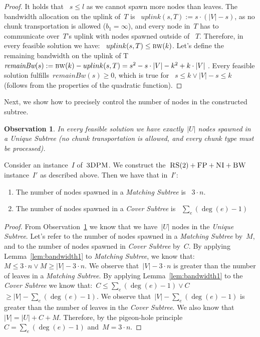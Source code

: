 \documentclass[preprint,12pt]{elsarticle}
\newcommand{\CC}{\textsc{NI}}
\newcommand{\FP}{\textsc{FP}}
\newcommand{\RS}{\textsc{RS}}
\newcommand{\BW}{\textsc{BW}}
\newcommand{\TDPM}{\textsc{3DPM}}
\newcommand{\numNodes}{\ensuremath{|V|}}
\newcommand{\UnqSubtree}{{{\emph{Unique Subtree}}}}
\newcommand{\MatchSubtree}{{\emph{Matching Subtree}}}
\newcommand{\CoverSubtree}{{\emph{Cover Subtree}}}
\newcommand{\remainBw}{\textit{remainBw}}
\newcommand{\Band}{\textsc{bw}}
\newtheorem{obs}{Observation}
\newcommand{\CostTrans}{\ensuremath{b_1}}
\begin{document}
\begin{proof}
It holds that ~$s\leq l$ as we cannot spawn more nodes than leaves.
  The bandwidth allocation on the uplink of~$T$ is
 ~$uplink(s,T) := s\cdot (\numNodes - s)$, as no chunk transportation
  is allowed ($\CostTrans = \infty$), and every node in~$T$ has to
  communicate over~$T$'s uplink with nodes spawned outside of
 ~$T$. Therefore, in every feasible solution we have:
 ~$uplink(s, T) \leq \Band(k)$.  Let's define the remaining bandwidth
  on the uplink of T~$\remainBw(s) := \Band(k)-uplink(s, T) = s^2 - s\cdot \numNodes -
  k^2+k\cdot \numNodes~$.
  Every feasible solution fulfills~$\remainBw(s) \geq 0$, which is true for
 ~$s \leq k \vee \numNodes-s\leq k$ (follows from the properties of the
  quadratic function).
\end{proof}


Next, we show how to precisely control the number of nodes in the
constructed subtree.

\begin{obs}
  In every feasible solution we have exactly~$|U|$ nodes spawned in a
  {\UnqSubtree} (no chunk transportation is allowed, and every chunk
  type must be processed).
  \label{obs:unq-full}
\end{obs}


\begin{lemma}
  Consider an instance~$I$ of~$\TDPM$. We construct the~$\RS(2)+\FP+\CC+\BW$ instance~$I'$
 as described above. Then we have that in~$I'$:
  \begin{enumerate}
    \item The number of nodes spawned in a {\MatchSubtree} is
   ~$3\cdot n$.
    \item The number of nodes spawned in a {\CoverSubtree} is
   ~$\sum_e(\deg(e)-1)$
  \end{enumerate}

  \label{lem:bandwidth2}
\end{lemma}

\begin{proof}
  From Observation~\ref{obs:unq-full} we know that we have~$|U|$ nodes
  in the {\UnqSubtree}. Let's refer to the number of nodes spawned in
  a {\MatchSubtree} by~$M$, and to the number of nodes spawned in
  {\CoverSubtree} by~$C$. By applying Lemma~\ref{lem:bandwidth1} to
  {\MatchSubtree}, we know that: $ M \leq 3\cdot n \vee M \geq |V| - 3\cdot n$.
  We observe that~$|V| - 3\cdot n$ is greater than the number of
  leaves in a {\MatchSubtree}.  By applying Lemma~\ref{lem:bandwidth1}
  to the {\CoverSubtree} we know that:~$ C \leq \sum_e(\deg(e)-1) \vee C$ $\geq |V| - \sum_e(\deg(e)-1)$.
  We observe that~$|V| - \sum_e(\deg(e)-1)$ is greater than the number
  of leaves in the {\CoverSubtree}.
  We also know that~$|V| = |U| + C + M$. Therefore, by the pigeon-hole principle
 ~$C = \sum_e(\deg(e)-1)$ and~$M = 3\cdot n$.
\end{proof}
\end{document}
